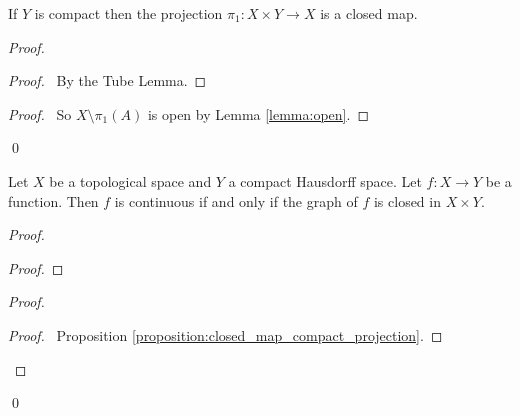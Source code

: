 \begin{proposition}
    \label{proposition:closed_map_compact_projection}
    If $Y$ is compact then the projection $\pi_1 : X \times Y \rightarrow X$
    is a closed map.
\end{proposition}

\begin{proof}
    \pf
    \begin{proof}
        \pf\ By the Tube Lemma.
    \end{proof}
    \qedstep
    \begin{proof}
        \pf\ So $X \setminus \pi_1(A)$ is open by Lemma \ref{lemma:open}.
    \end{proof}
    \qed
\end{proof}

\begin{theorem}
    Let $X$ be a topological space and $Y$ a compact Hausdorff space. Let $f : X \rightarrow Y$ be a function. Then $f$ is continuous if and only if
    the graph of $f$ is closed in $X \times Y$.
\end{theorem}

\begin{proof}
    \pf
    \begin{proof}
    \end{proof}
    \begin{proof}
        \begin{proof}
            \pf\ Proposition \ref{proposition:closed_map_compact_projection}.
        \end{proof}
    \end{proof}
    \qed
\end{proof}

